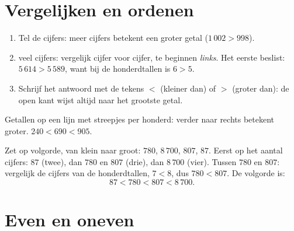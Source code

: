 \section{Vergelijken en ordenen}

\begin{method}\label{met:g3:numbers:compare}
\begin{enumerate}
  \item Tel de cijfers: meer cijfers betekent een groter getal
        ($1\,002 > 998$).
  \item {} veel cijfers: vergelijk cijfer voor cijfer, te beginnen
        \emph{links}. Het eerste  beslist:
        $5\,614 > 5\,589$, want bij de honderdtallen is $6 > 5$.
  \item Schrijf het antwoord met de tekens $<$ (kleiner dan) of $>$
        (groter dan): de open kant wijst altijd naar het grootste
        getal.
\end{enumerate}
\end{method}

\begin{omfigure}

{\small Getallen op een lijn met streepjes per honderd: verder naar
rechts betekent groter. $240 < 690 < 905$.}
\end{omfigure}

\begin{example}\label{ex:g3:numbers:order}
Zet op volgorde, van klein naar groot: $780$, $8\,700$, $807$, $87$.
Eerst op het aantal cijfers: $87$ (twee), dan $780$ en $807$ (drie), dan
$8\,700$ (vier). Tussen $780$ en $807$: vergelijk de cijfers van de
honderdtallen, $7 < 8$, dus $780 < 807$. De volgorde is:
\[
87 < 780 < 807 < 8\,700 .
\]
\end{example}

\section{Even en oneven}

